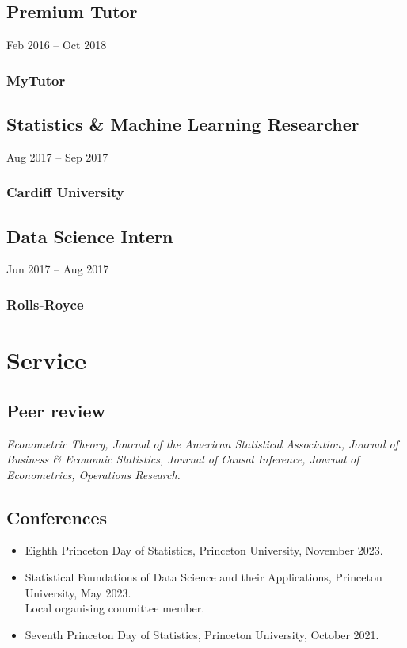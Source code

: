\documentclass{wgu-cv}
\begin{document}
\subsection{Premium Tutor}
{Feb 2016 -- Oct 2018}
\subsubsection{MyTutor}
\vspace{-0.20cm}

\subsection{Statistics \& Machine Learning Researcher}
{Aug 2017 -- Sep 2017}
\subsubsection{Cardiff University}
\vspace{-0.20cm}

\subsection{Data Science Intern}
{Jun 2017 -- Aug 2017}
\subsubsection{Rolls-Royce}

\pagebreak

\section{Service}

\subsection{Peer review}{}

\emph{%
  Econometric Theory,
  Journal of the American Statistical Association,
  Journal of Business \& Economic Statistics,
  Journal of Causal Inference,
  Journal of Econometrics,
  Operations Research.
}

\subsection{Conferences}{}
\begin{itemize}

  \item Eighth Princeton Day of Statistics,
    Princeton University, November 2023.

  \item Statistical Foundations of Data Science and their Applications,
    Princeton University, May 2023. \\
    Local organising committee member.

  \item Seventh Princeton Day of Statistics,
    Princeton University, October 2021.

\end{itemize}
\end{document}
